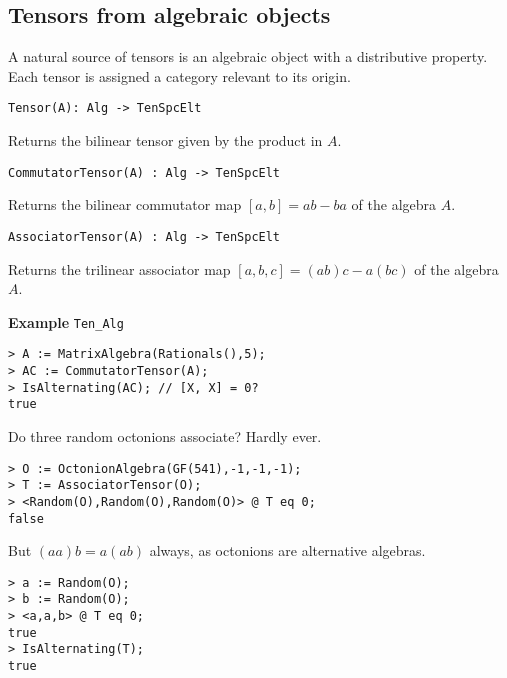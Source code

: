 \subsection{Tensors from algebraic objects}
A natural source of tensors is an algebraic object with a distributive 
property.
Each tensor is assigned a category relevant to its origin. 


\color{blue}
{\small \begin{verbatim}
Tensor(A): Alg -> TenSpcElt
\end{verbatim} }
\color{black}

Returns the bilinear tensor given by the product in $A$.

\color{blue}
{\small \begin{verbatim}
CommutatorTensor(A) : Alg -> TenSpcElt
\end{verbatim} }
\color{black}

Returns the bilinear commutator map $[a,b]=ab-ba$ of the algebra $A$.

\color{blue}
{\small \begin{verbatim}
AssociatorTensor(A) : Alg -> TenSpcElt
\end{verbatim} }
\color{black}

Returns the trilinear associator map $[a,b,c]=(ab)c-a(bc)$ of the algebra $A$.

\medskip
\begin{framed} {\bf Example} {\tt Ten\_Alg}\\
{\small
\begin{lstlisting}[frame=single,basicstyle=\ttfamily\color{black!30!
teal},backgroundcolor=\color{white!70!gray}]
> A := MatrixAlgebra(Rationals(),5);
> AC := CommutatorTensor(A);
> IsAlternating(AC); // [X, X] = 0?
true
\end{lstlisting}
Do three random octonions associate? Hardly ever.
\begin{lstlisting}[frame=single,basicstyle=\ttfamily\color{black!30!
teal},backgroundcolor=\color{white!70!gray}]
> O := OctonionAlgebra(GF(541),-1,-1,-1);
> T := AssociatorTensor(O);
> <Random(O),Random(O),Random(O)> @ T eq 0;
false
\end{lstlisting}
But $(aa)b=a(ab)$ always, as octonions are alternative algebras.
\begin{lstlisting}[frame=single,basicstyle=\ttfamily\color{black!30!
teal},backgroundcolor=\color{white!70!gray}]
> a := Random(O); 
> b := Random(O); 
> <a,a,b> @ T eq 0;
true
> IsAlternating(T);
true
\end{lstlisting}
}
\end{framed}


